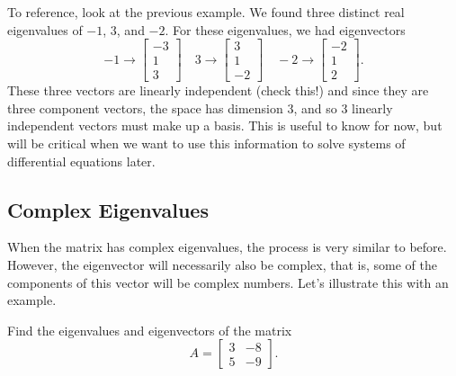 \documentclass{ximera}
\begin{document}
To reference, look at the previous example. We found three distinct real eigenvalues of $-1$, $3$, and $-2$. For these eigenvalues, we had eigenvectors
\begin{equation*}
    -1 \rightarrow 
    \begin{bmatrix} 
        -3 \\ 
        1 \\ 
        3 
    \end{bmatrix} 
    \quad 3 \rightarrow 
    \begin{bmatrix} 
        3 \\ 
        1 \\ 
        -2 
    \end{bmatrix} 
    \quad -2 \rightarrow 
    \begin{bmatrix} 
        -2 \\ 
        1 \\ 
        2 
    \end{bmatrix}.
\end{equation*} 
These three vectors are linearly independent (check this!) and since they are three component vectors, the space has dimension 3, and so 3 linearly independent vectors must make up a basis. This is useful to know for now, but will be critical when we want to use this information to solve systems of differential equations later. 

\subsection{Complex Eigenvalues}

When the matrix has complex eigenvalues, the process is very similar to before. However, the eigenvector will necessarily also be complex, that is, some of the components of this vector will be complex numbers. Let's illustrate this with an example.

\begin{example}
    Find the eigenvalues and eigenvectors of the matrix
    \[ 
        A = 
        \begin{bmatrix} 
            3 & -8 \\ 
            5 & -9 
        \end{bmatrix}.
    \]
\end{example}
\end{document}
